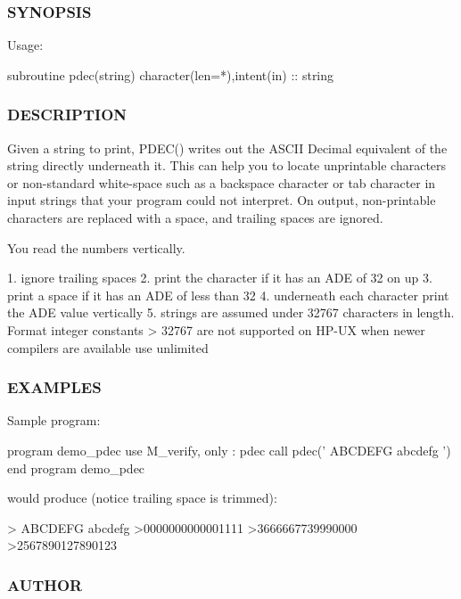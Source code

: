 \subsubsection*{S\+Y\+N\+O\+P\+S\+IS}

\begin{DoxyVerb}Usage:

 subroutine pdec(string)
 character(len=*),intent(in) :: string
\end{DoxyVerb}


\subsubsection*{D\+E\+S\+C\+R\+I\+P\+T\+I\+ON}

\begin{DoxyVerb}Given a string to print, PDEC() writes out the ASCII Decimal equivalent
of the string directly underneath it. This can help you to locate
unprintable characters or non-standard white-space such as a backspace
character or tab character in input strings that your program could
not interpret. On output, non-printable characters are replaced with
a space, and trailing spaces are ignored.

You read the numbers vertically.

1. ignore trailing spaces
2. print the character if it has an ADE of 32 on up
3. print a space if it has an ADE of less than 32
4. underneath each character print the ADE value vertically
5. strings are assumed under 32767 characters in length.
   Format integer constants > 32767 are not supported on HP-UX
   when newer compilers are available use unlimited
\end{DoxyVerb}


\subsubsection*{E\+X\+A\+M\+P\+L\+ES}

\begin{DoxyVerb}Sample program:

   program demo_pdec
   use M_verify, only : pdec
   call pdec(' ABCDEFG abcdefg    ')
   end program demo_pdec

would produce (notice trailing space is trimmed):

  > ABCDEFG abcdefg
  >0000000000001111
  >3666667739990000
  >2567890127890123
\end{DoxyVerb}


\subsubsection*{A\+U\+T\+H\+OR}

